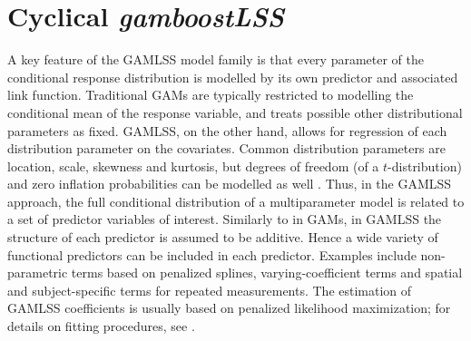 \section{Cyclical \textit{gamboostLSS}}\label{sec:gamlssboost}
A key feature of the GAMLSS model family is that every parameter of the conditional response distribution is modelled by its own predictor and associated link function.
Traditional GAMs \citep{gam-book} are typically restricted to modelling the conditional mean of the response variable, and treats possible other distributional parameters as fixed.
GAMLSS, on the other hand, allows for regression of each distribution parameter on the covariates.
Common distribution parameters are location, scale, skewness and kurtosis, but degrees of freedom (of a $t$-distribution) and zero inflation probabilities can be modelled as well \citep{gamboostlss-paper, gamboostLSS-manual}.
Thus, in the GAMLSS approach, the full conditional distribution of a multiparameter model is related to a set of predictor variables of interest.
Similarly to in GAMs, in GAMLSS the structure of each predictor is assumed to be additive.
Hence a wide variety of functional predictors can be included in each predictor.
Examples include non-parametric terms based on penalized splines, varying-coefficient terms and spatial and subject-specific terms for repeated measurements.
The estimation of GAMLSS coefficients is usually based on penalized likelihood maximization; for details on fitting procedures, see \citet{gamlss}.

